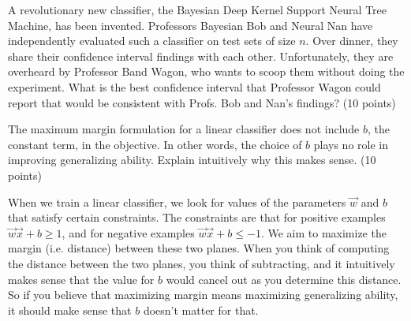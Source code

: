 \documentclass[fleqn]{homework}
\begin{document}
  \begin{problem}{4}
    \begin{question}
      A revolutionary new classifier, the Bayesian Deep Kernel Support Neural
      Tree Machine, has been invented.  Professors Bayesian Bob and Neural Nan
      have independently evaluated such a classifier on test sets of size $n$.
      Over dinner, they share their confidence interval findings with each
      other.  Unfortunately, they are overheard by Professor Band Wagon, who
      wants to scoop them without doing the experiment.  What is the best
      confidence interval that Professor Wagon could report that would be
      consistent with Profs. Bob and Nan's findings? (10 points)
    \end{question}
  \end{problem}

  \begin{problem}{5}
    \begin{question}
      The maximum margin formulation for a linear classifier does not include
      $b$, the constant term, in the objective.  In other words, the choice of
      $b$ plays no role in improving generalizing ability.  Explain intuitively
      why this makes sense. (10 points)
    \end{question}

    When we train a linear classifier, we look for values of the parameters
    $\vec{w}$ and $b$ that satisfy certain constraints.  The constraints are
    that for positive examples $\vec{w}\vec{x} + b \ge 1$, and for negative
    examples $\vec{w}\vec{x} + b \le -1$.  We aim to maximize the margin
    (i.e. distance) between these two planes.  When you think of computing the
    distance between the two planes, you think of subtracting, and it
    intuitively makes sense that the value for $b$ would cancel out as you
    determine this distance.  So if you believe that maximizing margin means
    maximizing generalizing ability, it should make sense that $b$ doesn't
    matter for that.
 \end{problem}
\end{document}
